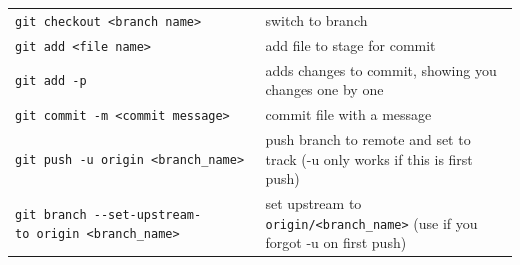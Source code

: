 \documentclass[]{book}
\begin{document}
\begin{longtable}[]{@{}ll@{}}
\begin{minipage}[t]{0.13\columnwidth}\raggedright\strut
\texttt{git\ checkout\ \textless{}branch\ name\textgreater{}}\strut
\end{minipage} & \begin{minipage}[t]{0.22\columnwidth}\raggedright\strut
switch to branch\strut
\end{minipage}\tabularnewline
\begin{minipage}[t]{0.13\columnwidth}\raggedright\strut
\texttt{git\ add\ \textless{}file\ name\textgreater{}}\strut
\end{minipage} & \begin{minipage}[t]{0.22\columnwidth}\raggedright\strut
add file to stage for commit\strut
\end{minipage}\tabularnewline
\begin{minipage}[t]{0.13\columnwidth}\raggedright\strut
\texttt{git\ add\ -p}\strut
\end{minipage} & \begin{minipage}[t]{0.22\columnwidth}\raggedright\strut
adds changes to commit, showing you changes one by one\strut
\end{minipage}\tabularnewline
\begin{minipage}[t]{0.13\columnwidth}\raggedright\strut
\texttt{git\ commit\ -m\ \textless{}commit\ message\textgreater{}}\strut
\end{minipage} & \begin{minipage}[t]{0.22\columnwidth}\raggedright\strut
commit file with a message\strut
\end{minipage}\tabularnewline
\begin{minipage}[t]{0.13\columnwidth}\raggedright\strut
\texttt{git\ push\ -u\ origin\ \textless{}branch\_name\textgreater{}}\strut
\end{minipage} & \begin{minipage}[t]{0.22\columnwidth}\raggedright\strut
push branch to remote and set to track (-u only works if this is first
push)\strut
\end{minipage}\tabularnewline
\begin{minipage}[t]{0.13\columnwidth}\raggedright\strut
\texttt{git\ branch\ -\/-set-upstream-to\ origin\ \textless{}branch\_name\textgreater{}}\strut
\end{minipage} & \begin{minipage}[t]{0.22\columnwidth}\raggedright\strut
set upstream to \texttt{origin/\textless{}branch\_name\textgreater{}}
(use if you forgot -u on first push)\strut
\end{minipage}\tabularnewline

\end{longtable}
\end{document}
